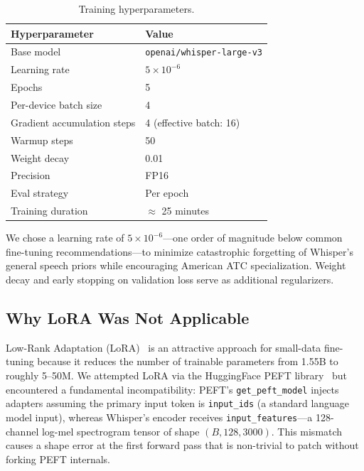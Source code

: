 \documentclass[11pt,a4paper]{article}
\begin{document}
\begin{table}[h]
\centering
\caption{Training hyperparameters.}
\begin{tabular}{ll}
\toprule
\textbf{Hyperparameter} & \textbf{Value} \\
\midrule
Base model                   & \texttt{openai/whisper-large-v3} \\
Learning rate                & $5 \times 10^{-6}$ \\
Epochs                       & 5 \\
Per-device batch size        & 4 \\
Gradient accumulation steps  & 4 (effective batch: 16) \\
Warmup steps                 & 50 \\
Weight decay                 & 0.01 \\
Precision                    & FP16 \\
Eval strategy                & Per epoch \\
Training duration            & $\approx$ 25 minutes \\
\bottomrule
\end{tabular}
\end{table}

We chose a learning rate of $5 \times 10^{-6}$---one order of magnitude below
common fine-tuning recommendations---to minimize catastrophic forgetting of
Whisper's general speech priors while encouraging American ATC specialization.
Weight decay and early stopping on validation loss serve as additional
regularizers.

\subsection{Why LoRA Was Not Applicable}
\label{sec:lora}

Low-Rank Adaptation (LoRA)~\cite{hu2021lora} is an attractive approach for
small-data fine-tuning because it reduces the number of trainable parameters
from 1.55B to roughly 5--50M.
We attempted LoRA via the HuggingFace PEFT library~\cite{peft2023} but
encountered a fundamental incompatibility: PEFT's \texttt{get\_peft\_model}
injects adapters assuming the primary input token is \texttt{input\_ids}
(a standard language model input), whereas Whisper's encoder receives
\texttt{input\_features}---a 128-channel log-mel spectrogram tensor of shape
$(B, 128, 3000)$.
This mismatch causes a shape error at the first forward pass that is non-trivial
to patch without forking PEFT internals.
\end{document}
